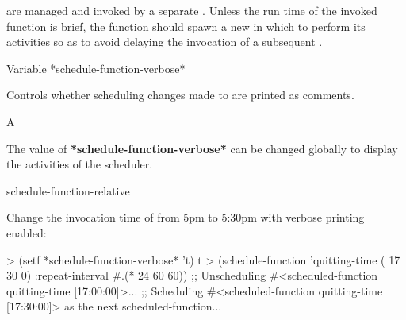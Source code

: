 \documentclass[10pt,twoside,english,pdftex]{article}
\begin{document}
 are managed and invoked by a separate
 .  Unless the run
time of the invoked function is brief, the function should spawn a new
 in which to perform its activities so as to avoid
delaying the invocation of a subsequent .

\W\entities
\T\clearpage


\begin{functiondoc}{Variable}%
  {*schedule-function-verbose*}{}%

\fnsyntax

\fnpurpose Controls whether scheduling changes made to
 are printed as comments. 

\fnpackage {}

\fnmodule {}

\fnvaluetype A 

\fninitialvalue \nil

\fndescription The value of \textbf{*schedule-function-verbose*} can be
changed globally to display the activities of the 
scheduler.

\begin{alsos}{schedule-function-relative}
\end{alsos}

%
\fnexample 
Change the invocation time of  
from 5pm to 5:30pm with verbose printing enabled:
\begin{example}
> (setf *schedule-function-verbose* 't)
t
> (schedule-function 'quitting-time ( 17 30 0)
    :repeat-interval #.(* 24 60 60))
;; Unscheduling #<scheduled-function quitting-time [17:00:00]>...
;; Scheduling #<scheduled-function quitting-time [17:30:00]> 
   as the next scheduled-function...
\end{example}

\end{functiondoc}

\end{document}
